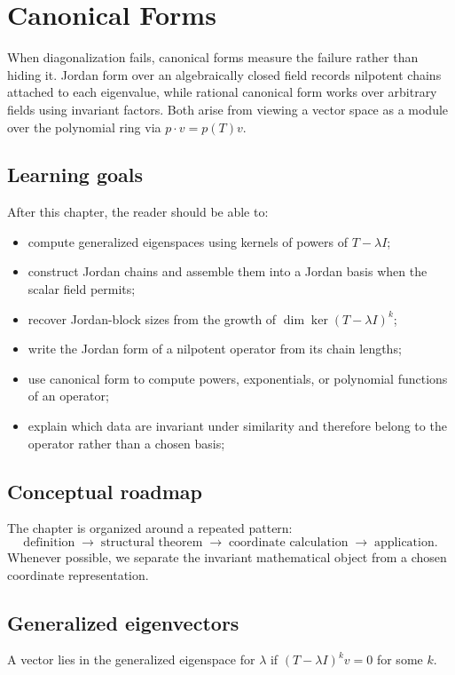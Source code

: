 \chapter{Canonical Forms}
\label{ch:i12-canonical-forms}

When diagonalization fails, canonical forms measure the failure rather than hiding it. Jordan form over an algebraically closed field records nilpotent chains attached to each eigenvalue, while rational canonical form works over arbitrary fields using invariant factors. Both arise from viewing a vector space as a module over the polynomial ring via $p\cdot v=p(T)v$.

\section*{Learning goals}
After this chapter, the reader should be able to:
\begin{itemize}
\item compute generalized eigenspaces using kernels of powers of \(T-\lambda I\);
\item construct Jordan chains and assemble them into a Jordan basis when the scalar field permits;
\item recover Jordan-block sizes from the growth of \(\dim\ker(T-\lambda I)^k\);
\item write the Jordan form of a nilpotent operator from its chain lengths;
\item use canonical form to compute powers, exponentials, or polynomial functions of an operator;
\item explain which data are invariant under similarity and therefore belong to the operator rather than a chosen basis;
\end{itemize}
\section*{Conceptual roadmap}
The chapter is organized around a repeated pattern:
\[
\boxed{\text{definition}\;\longrightarrow\;\text{structural theorem}\;\longrightarrow\;\text{coordinate calculation}\;\longrightarrow\;\text{application}.}
\]
Whenever possible, we separate the invariant mathematical object from a chosen coordinate representation.

\section{Generalized eigenvectors}
A vector lies in the generalized eigenspace for $\lambda$ if $(T-\lambda I)^k v=0$ for some $k$.

